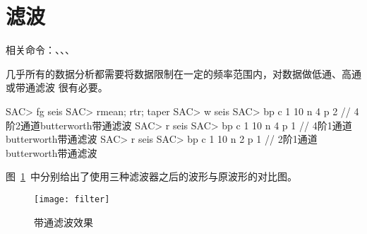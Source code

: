 \section{滤波}
相关命令：、、、

几乎所有的数据分析都需要将数据限制在一定的频率范围内，对数据做低通、高通或带通滤波
很有必要。

\begin{SACCode}
SAC> fg seis
SAC> rmean; rtr; taper
SAC> w seis
SAC> bp c 1 10 n 4 p 2  // 4阶2通道butterworth带通滤波
SAC> r seis
SAC> bp c 1 10 n 4 p 1  // 4阶1通道butterworth带通滤波
SAC> r seis
SAC> bp c 1 10 n 2 p 1  // 2阶1通道butterworth带通滤波
\end{SACCode}

图~\ref{fig:filter}~中分别给出了使用三种滤波器之后的波形与原波形的对比图。

\begin{figure}[H]
\centering
\texttt{[image: filter]}
\caption{带通滤波效果}
\label{fig:filter}
\end{figure}
